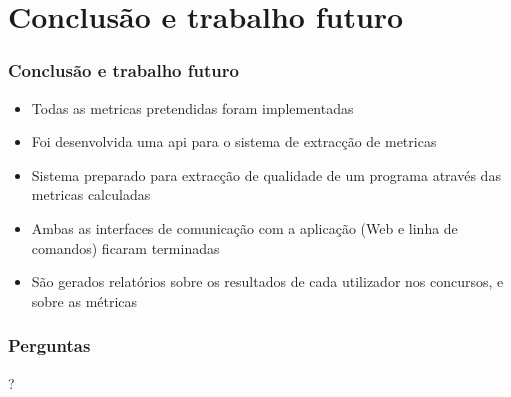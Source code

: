\documentclass{beamer}
\begin{document}
\section{Conclusão e trabalho futuro}
\begin{frame} \frametitle{Conclusão e trabalho futuro}
\begin{itemize}
\item Todas as metricas pretendidas foram implementadas
\item Foi desenvolvida uma api para o sistema de extracção de metricas 
\item Sistema preparado para extracção de qualidade de um programa através das metricas calculadas
\item Ambas as interfaces de comunicação com a aplicação (Web e linha de comandos) ficaram terminadas
\item São gerados relatórios sobre os resultados de cada utilizador nos concursos, e sobre as métricas
\end{itemize}
\end{frame}

\begin{frame} \frametitle{Perguntas}
\begin{center}\huge{?}\end{center}
\end{frame}
\end{document}
